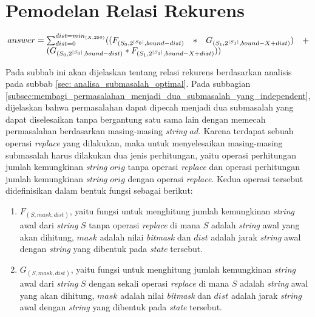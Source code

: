 \section{Pemodelan Relasi Rekurens}
\label{sec:pemodelan_relasi_rekurens}
    
\begin{equation}
answer = \parbox[t]{0.9\textwidth}{ $\sum_{dist=0}^{dist=min_{(X, 250)}}((F_{(S_{0}, 2^{|S_{0}|}, bound - dist)} * G_{(S_{1}, 2^{|S_{1}|}, bound - X + dist)}) + (G_{(S_{0}, 2^{|S_{0}|}, bound -dist)} * F_{(S_{1},2^{|S_{1}|},bound-X+dist)}))$}
\label{equation:main_answer}
\end{equation}    
    
Pada subbab ini akan dijelaskan tentang relasi rekurens berdasarkan analisis pada subbab \ref{sec: analisa_submasalah_optimal}. Pada subbagian \ref{subsec:membagi_permasalahan_menjadi_dua_submasalah_yang_independent}, dijelaskan bahwa permasalahan dapat dipecah menjadi dua submasalah yang dapat diselesaikan tanpa bergantung satu sama lain dengan memecah permasalahan berdasarkan masing-masing \textit{string} $ad$. Karena terdapat sebuah operasi \textit{replace} yang dilakukan, maka untuk menyelesaikan masing-masing submasalah harus dilakukan dua jenis perhitungan, yaitu operasi perhitungan jumlah kemungkinan \textit{string} $orig$ tanpa operasi \textit{replace} dan operasi perhitungan jumlah kemungkinan \textit{string} $orig$ dengan operasi \textit{replace}. Kedua operasi tersebut didefinisikan dalam bentuk fungsi sebagai berikut:
\begin{enumerate}
	\item $F_{(S, mask, dist)}$, yaitu fungsi untuk menghitung jumlah kemungkinan \textit{string} awal dari \textit{string} $ S $ tanpa operasi \textit{replace} di mana $S$ adalah \textit{string} awal yang akan dihitung, $mask$ adalah nilai \textit{bitmask} dan $dist$ adalah jarak \textit{string} awal dengan \textit{string} yang dibentuk pada \textit{state} tersebut.
	\label{itm: fungsi_f}
	\item $G_{(S, mask, dist)}$, yaitu fungsi untuk menghitung jumlah kemungkinan \textit{string} awal dari \textit{string} $ S $ dengan sekali operasi \textit{replace} di mana $S$ adalah \textit{string} awal yang akan dihitung, $mask$ adalah nilai \textit{bitmask} dan $dist$ adalah jarak \textit{string} awal dengan \textit{string} yang dibentuk pada \textit{state} tersebut.
	\label{itm: fungsi_g} 
\end{enumerate}

